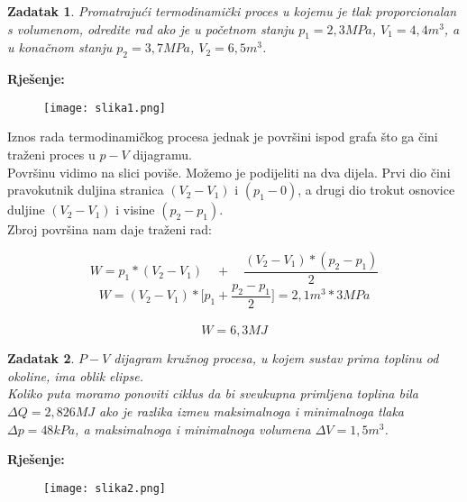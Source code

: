 \documentclass[a4paper,12pt]{article}
\newtheorem{ZDK}{Zadatak}[section]
\begin{document}
\newpage
\begin{ZDK}
	Promatraju\'ci termodinami\v{c}ki proces u kojemu je tlak proporcionalan s volumenom, odredite rad ako je u po\v{c}etnom stanju
	$p_1=2,3MPa$, $V_1=4,4m^3$, a u kona\v{c}nom stanju $p_2=3,7MPa$, $V_2=6,5m^3$.
\end{ZDK}
\textbf{Rje\v{s}enje:} \\

 \begin{figure}[h!]
        \centering
	\texttt{[image: slika1.png]}
 \end{figure}
Iznos rada termodinami\v{c}kog procesa jednak je povr\v{s}ini ispod grafa \v{s}to ga \v{c}ini tra\v{z}eni proces u $p-V$ dijagramu. \\
Povr\v{s}inu vidimo na slici povi\v{s}e. Mo\v{z}emo je podijeliti na dva dijela. Prvi dio \v{c}ini pravokutnik duljina stranica 
$(V_2-V_1)$ i $(p_1-0)$, a drugi dio trokut osnovice duljine $(V_2-V_1)$ i visine $(p_2-p_1)$. \\
\newline
Zbroj povr\v{s}ina nam daje tra\v{z}eni rad:

$$ W=p_1*(V_2-V_1) \quad + \quad \frac{(V_2-V_1)*(p_2-p_1)}{2} $$
$$ W=(V_2-V_1)*\Big[ p_1+\frac{p_2-p_1}{2}  \Big]=2,1m^3*3MPa $$
\\
$$ W=6,3MJ $$



\newpage
\begin{ZDK}
	$P-V$ dijagram kru\v{z}nog procesa, u kojem sustav prima toplinu od okoline, ima oblik elipse. \\
	Koliko puta moramo ponoviti ciklus da bi sveukupna primljena toplina bila $\Delta Q=2,826 MJ$ ako je razlika
	izme\dj u maksimalnoga i minimalnoga tlaka $\Delta p=48 kPa$, a maksimalnoga i minimalnoga volumena $\Delta V=1,5m^3$. \\
\end{ZDK}
\textbf{Rje\v{s}enje:} \\

 \begin{figure}[h!]
        \centering
	\texttt{[image: slika2.png]}
 \end{figure}
\end{document}

